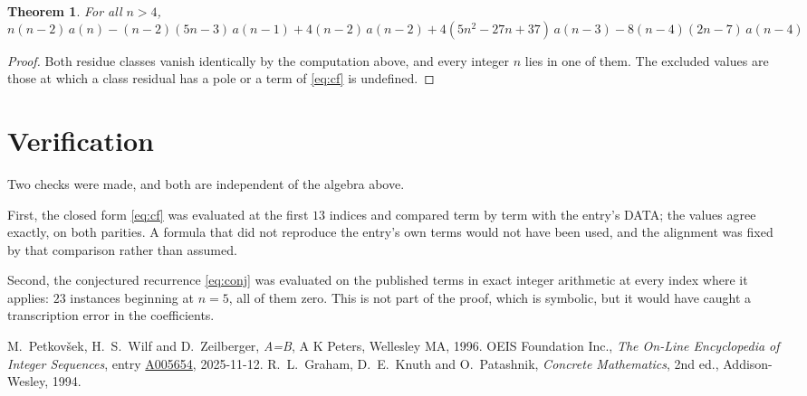 \documentclass[11pt,a4paper]{article}
\theoremstyle{plain}
\newtheorem{theorem}{Theorem}
\theoremstyle{definition}
\begin{document}
\begin{theorem}
For all $n> 4$,
\[
n \left(n - 2\right)\,a(n) -  \left(n - 2\right) \left(5 n - 3\right)\,a(n-1) + 4 \left(n - 2\right)\,a(n-2) + 4 \left(5 n^{2} - 27 n + 37\right)\,a(n-3) -  8 \left(n - 4\right) \left(2 n - 7\right)\,a(n-4)
\]
\end{theorem}

\begin{proof}
Both residue classes vanish identically by the computation above, and every integer $n$
lies in one of them. The excluded values are those at which a class residual has a pole or
a term of \eqref{eq:cf} is undefined.
\end{proof}

\section{Verification}

Two checks were made, and both are independent of the algebra above.

First, the closed form \eqref{eq:cf} was evaluated at the first $13$ indices and
compared term by term with the entry's DATA; the values agree exactly, on both parities. A
formula that did not reproduce the entry's own terms would not have been used, and the
alignment was fixed by that comparison rather than assumed.

Second, the conjectured recurrence \eqref{eq:conj} was evaluated on the published terms in
exact integer arithmetic at every index where it applies: $23$ instances beginning at
$n=5$, all of them zero. This is not part of the proof, which is symbolic, but it
would have caught a transcription error in the coefficients.

\begin{thebibliography}{9}
 M.~Petkov\v{s}ek, H.~S.~Wilf and D.~Zeilberger, \emph{A=B}, A K Peters,
Wellesley MA, 1996.
 OEIS Foundation Inc., \emph{The On-Line Encyclopedia of Integer Sequences},
entry \href{https://oeis.org/A005654}{A005654}, 2025-11-12.
 R.~L.~Graham, D.~E.~Knuth and O.~Patashnik, \emph{Concrete Mathematics},
2nd ed., Addison-Wesley, 1994.
\end{thebibliography}
\end{document}
